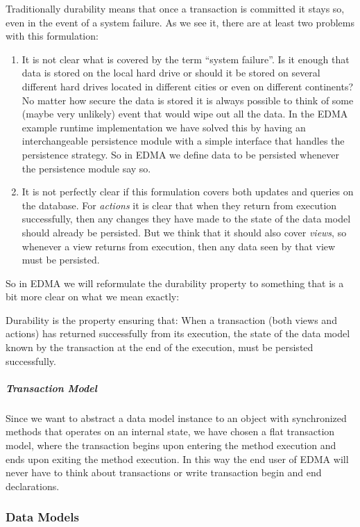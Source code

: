 Traditionally durability means that once a transaction is committed
it stays so, even in the event of a system failure. As we see it,
there are at least two problems with this formulation:
\begin{enumerate}
\item It is not clear what is covered by the term ``system failure''.
Is it enough that data is stored on the local hard drive or should
it be stored on several different hard drives located in different
cities or even on different continents? No matter how secure the data
is stored it is always possible to think of some (maybe very unlikely)
event that would wipe out all the data. In the EDMA example runtime
implementation we have solved this by having an interchangeable persistence
module with a simple interface that handles the persistence strategy.
So in EDMA we define data to be persisted whenever the persistence
module say so.
\item It is not perfectly clear if this formulation covers both updates
and queries on the database. For \emph{actions} it is clear that when
they return from execution successfully, then any changes they have
made to the state of the data model should already be persisted. But
we think that it should also cover \emph{views}, so whenever a view
returns from execution, then any data seen by that view must be persisted.
\end{enumerate}
So in EDMA we will reformulate the durability property to something
that is a bit more clear on what we mean exactly: 

Durability is the property ensuring that: When a transaction (both
views and actions) has returned successfully from its execution, the
state of the data model known by the transaction at the end of the
execution, must be persisted successfully.


\subparagraph{Transaction Model}

Since we want to abstract a data model instance to an object with
synchronized methods that operates on an internal state, we have chosen
a flat transaction model, where the transaction begins upon entering
the method execution and ends upon exiting the method execution. In
this way the end user of EDMA will never have to think about transactions
or write transaction begin and end declarations.


\subsubsection{Data Models}

